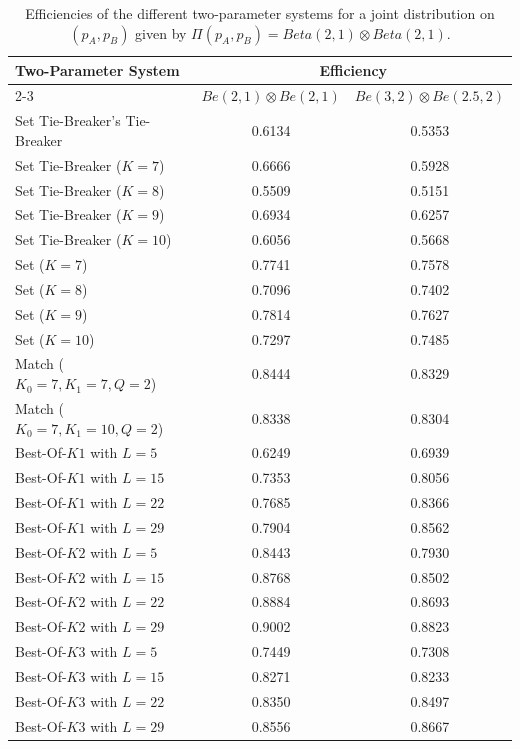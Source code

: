 \documentclass[11pt]{article}
\theoremstyle{plain}
\theoremstyle{definition}
\begin{document}
\begin{table}[h]
\begin{center}
\begin{tabular}{|l|c|c|} \hline\hline
Two-Parameter System & \multicolumn{2}{c|}{Efficiency} \\ \cline{2-3}
& $Be(2,1) \otimes Be(2,1)$ & $Be(3,2) \otimes Be(2.5,2)$ \\ \hline\hline
Set Tie-Breaker's Tie-Breaker  & 0.6134 & 0.5353  \\ \hline
Set Tie-Breaker ($K=7$) & 0.6666 & 0.5928 \\ 
Set Tie-Breaker ($K=8$) & 0.5509 &  0.5151 \\ 
Set Tie-Breaker ($K=9$) & 0.6934 & 0.6257 \\ 
Set Tie-Breaker ($K=10$) & {0.6056} & 0.5668 \\ \hline
Set ($K=7$) & 0.7741 & 0.7578 \\
Set ($K=8$) & 0.7096 & 0.7402 \\
Set ($K = 9$) & 0.7814 & 0.7627 \\
Set ($K =10$) & 0.7297 & 0.7485 \\ \hline
Match ($K_0=7,K_1=7,Q=2$) & 0.8444 & 0.8329 \\
Match ($K_0=7,K_1=10,Q=2$) & 0.8338 & 0.8304 \\ \hline
Best-Of-$K1$ with $L = 5$ & 0.6249 & 0.6939 \\ 
Best-Of-$K1$ with $L = 15$ & 0.7353 & 0.8056 \\
Best-Of-$K1$ with $L = 22$ & 0.7685 & 0.8366 \\
Best-Of-$K1$ with $L = 29$ & 0.7904 & 0.8562 \\ \hline
Best-Of-$K2$ with $L = 5$ & 0.8443 & 0.7930 \\
Best-Of-$K2$ with $L = 15$ & 0.8768 & 0.8502 \\
Best-Of-$K2$ with $L = 22$ & 0.8884 & 0.8693 \\
Best-Of-$K2$ with $L = 29$ & 0.9002 & 0.8823 \\ \hline
Best-Of-$K3$ with $L = 5$ & 0.7449& 0.7308 \\
Best-Of-$K3$ with $L = 15$ & 0.8271 & 0.8233 \\
Best-Of-$K3$ with $L = 22$ & 0.8350 & 0.8497 \\
Best-Of-$K3$ with $L = 29$ & 0.8556 & 0.8667 \\
\hline\hline
\end{tabular}
\caption{Efficiencies of the different two-parameter systems for a joint distribution on $(p_A,p_B)$ given by $\Pi(p_A,p_B) = Beta(2,1) \otimes Beta(2,1).$}
\label{tab: efficiencies of two parameter systems}
\end{center}
\end{table}
\end{document}
